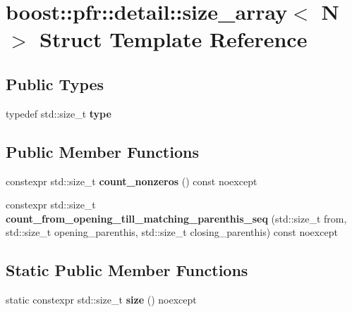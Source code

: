\hypertarget{structboost_1_1pfr_1_1detail_1_1size__array}{}\section{boost\+:\+:pfr\+:\+:detail\+:\+:size\+\_\+array$<$ N $>$ Struct Template Reference}
\label{structboost_1_1pfr_1_1detail_1_1size__array}
\subsection*{Public Types}
\begin{DoxyCompactItemize}
\item 
\mbox{\label{structboost_1_1pfr_1_1detail_1_1size__array_aa1219aa46f28f14a766ec26e7f51b92f}} 
typedef std\+::size\+\_\+t {\bfseries type}
\end{DoxyCompactItemize}
\subsection*{Public Member Functions}
\begin{DoxyCompactItemize}
\item 
\mbox{\label{structboost_1_1pfr_1_1detail_1_1size__array_a5603ed17d1e0ef9166702f786889cc34}} 
constexpr std\+::size\+\_\+t {\bfseries count\+\_\+nonzeros} () const noexcept
\item 
\mbox{\label{structboost_1_1pfr_1_1detail_1_1size__array_a2cd7a31a006b4ee117e113f9f6696612}} 
constexpr std\+::size\+\_\+t {\bfseries count\+\_\+from\+\_\+opening\+\_\+till\+\_\+matching\+\_\+parenthis\+\_\+seq} (std\+::size\+\_\+t from, std\+::size\+\_\+t opening\+\_\+parenthis, std\+::size\+\_\+t closing\+\_\+parenthis) const noexcept
\end{DoxyCompactItemize}
\subsection*{Static Public Member Functions}
\begin{DoxyCompactItemize}
\item 
\mbox{\label{structboost_1_1pfr_1_1detail_1_1size__array_a4f250169df13194ebee162cdb77367e7}} 
static constexpr std\+::size\+\_\+t {\bfseries size} () noexcept
\end{DoxyCompactItemize}
